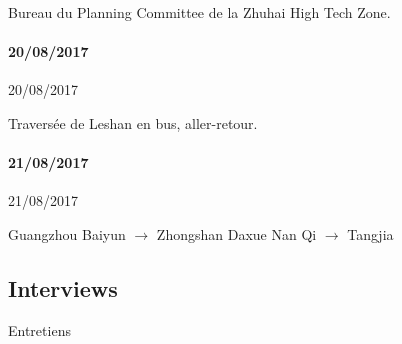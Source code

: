 Bureau du Planning Committee de la Zhuhai High Tech Zone.



\paragraph{20/08/2017}{20/08/2017}

Traversée de Leshan en bus, aller-retour.



\paragraph{21/08/2017}{21/08/2017}

Guangzhou Baiyun $\rightarrow$ Zhongshan Daxue Nan Qi $\rightarrow$ Tangjia














\subsection{Interviews}{Entretiens}









